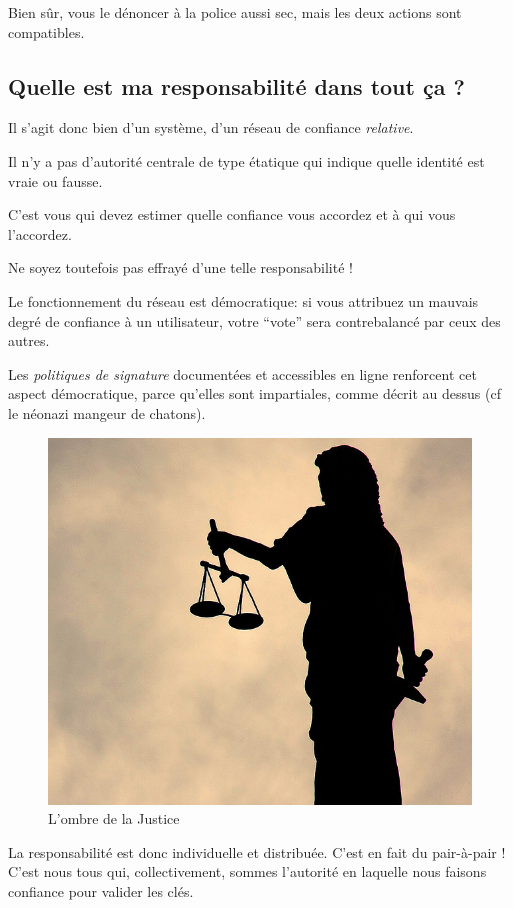 
Bien sûr, vous le dénoncer à la police aussi sec, mais les deux actions
sont compatibles.

\subsection{Quelle est ma responsabilité dans tout ça ?}\label{quelle-est-ma-responsabilituxe9-dans-tout-uxe7a}

Il s'agit donc bien d'un système, d'un réseau de confiance
\emph{relative}.

Il n'y a pas d'autorité centrale de type étatique qui indique quelle
identité est vraie ou fausse.

C'est vous qui devez estimer quelle confiance vous accordez et à qui
vous l'accordez.

Ne soyez toutefois pas effrayé d'une telle responsabilité !

Le fonctionnement du réseau est démocratique: si vous attribuez un
mauvais degré de confiance à un utilisateur, votre ``vote'' sera
contrebalancé par ceux des autres.

Les \emph{politiques de signature} documentées et accessibles en ligne
renforcent cet aspect démocratique, parce qu'elles sont impartiales,
comme décrit au dessus (cf le néonazi mangeur de chatons).

\begin{figure}[h]
\centering
\includegraphics[width=0.7\linewidth]{./images/justice.jpg}
\caption{L'ombre de la Justice}
\end{figure}

La responsabilité est donc individuelle et distribuée. C'est en fait du
pair-à-pair ! C'est nous tous qui, collectivement, sommes l'autorité en
laquelle nous faisons confiance pour valider les clés.

